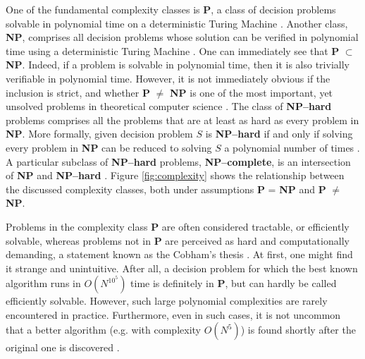 One of the fundamental complexity classes is \textbf{P}, a class of decision problems solvable in polynomial time on a deterministic Turing Machine  \cite{arora}. Another class, \textbf{NP}, comprises all decision problems whose solution can be verified in polynomial time using a deterministic Turing Machine \cite{arora}.
One can immediately see that \textbf{P} $\subset$ \textbf{NP}. Indeed, if a problem is solvable in polynomial time, then it is also trivially verifiable in polynomial time. However, it is not immediately obvious if the inclusion is strict, and whether \textbf{P} $\ne$ \textbf{NP} is one of the most important, yet unsolved problems in theoretical computer science \cite{fortnow}.
The class of \textbf{NP--hard} problems comprises all the problems that are at least as hard as
every problem in \textbf{NP}. More formally, given decision problem $S$ is \textbf{NP--hard} if and
only if solving every problem in \textbf{NP} can be reduced to solving $S$ a polynomial number of times
\cite{arora}. A particular subclass of \textbf{NP--hard} problems, \textbf{NP--complete}, is an
intersection of \textbf{NP} and \textbf{NP--hard} \cite{arora}. Figure \ref{fig:complexity} shows
the relationship between the discussed complexity classes, both under assumptions \textbf{P} =
\textbf{NP} and \textbf{P} $\ne$ \textbf{NP}.

Problems in the complexity class \textbf{P} are often considered tractable, or efficiently solvable,
whereas problems not in \textbf{P} are perceived as hard and computationally demanding, a statement
known as the Cobham's thesis \cite{cobham, arora}. At first, one might find it strange and
unintuitive. After all, a decision problem for which the best known algorithm runs in $O(N^{10^5})$
time is definitely in  \textbf{P}, but can hardly be called efficiently solvable. However, such
large polynomial complexities are rarely encountered in practice. Furthermore, even in such cases,
it is not uncommon that a better algorithm (e.g. with complexity $O(N^5)$) is found shortly after
the original one is discovered \cite{arora}.

